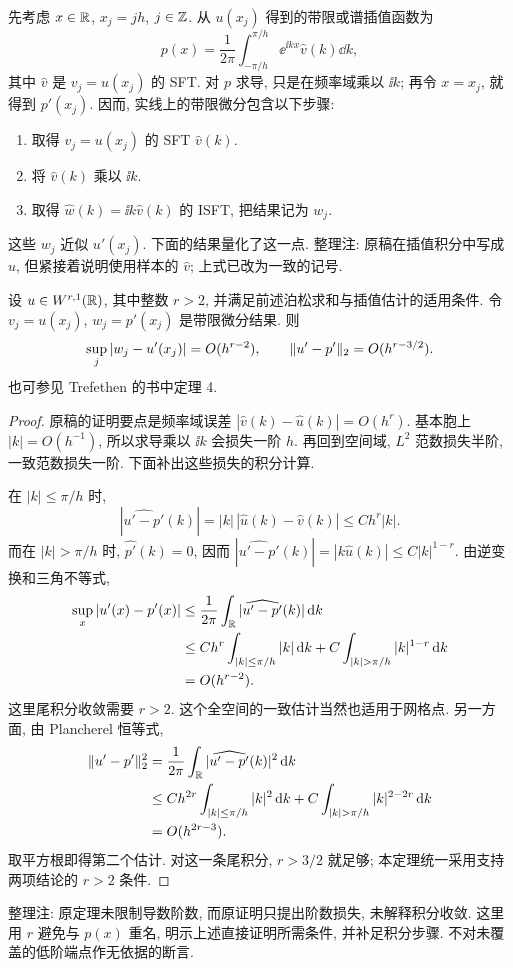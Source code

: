 先考虑 $x\in\mathbb R$, $x_j=jh$, $j\in\mathbb Z$. 从 $u(x_j)$ 得到的带限或谱插值函数为
\[
p(x)=\frac1{2\pi}\int_{-\pi/h}^{\pi/h}\ee^{\ii kx}\widehat v(k)\dd k,
\]
其中 $\widehat v$ 是 $v_j=u(x_j)$ 的 SFT. 对 $p$ 求导, 只是在频率域乘以 $\ii k$; 再令 $x=x_j$, 就得到 $p'(x_j)$. 因而, 实线上的带限微分包含以下步骤:
\begin{enumerate}
\item 取得 $v_j=u(x_j)$ 的 SFT $\widehat v(k)$.
\item 将 $\widehat v(k)$ 乘以 $\ii k$.
\item 取得 $\widehat w(k)=\ii k\widehat v(k)$ 的 ISFT, 把结果记为 $w_j$.
\end{enumerate}
这些 $w_j$ 近似 $u'(x_j)$. 下面的结果量化了这一点. 整理注: 原稿在插值积分中写成 $\widehat u$, 但紧接着说明使用样本的 $\widehat v$; 上式已改为一致的记号.

\begin{theorem}[带限微分的精度]\label{thm:bandlimited-differentiation}
设 $u\in W^{r,1}(\mathbb R)$, 其中整数 $r>2$, 并满足前述泊松求和与插值估计的适用条件. 令 $v_j=u(x_j)$, $w_j=p'(x_j)$ 是带限微分结果. 则
\[
\sup_j|w_j-u'(x_j)|=O(h^{r-2}),
\qquad
\lVert u'-p'\rVert_2=O(h^{r-3/2}).
\]
也可参见 Trefethen 的书中定理 4.
\end{theorem}
\begin{proof}
原稿的证明要点是频率域误差 $|\widehat v(k)-\widehat u(k)|=O(h^r)$. 基本胞上 $|k|=O(h^{-1})$, 所以求导乘以 $\ii k$ 会损失一阶 $h$. 再回到空间域, $L^2$ 范数损失半阶, 一致范数损失一阶. 下面补出这些损失的积分计算.

在 $|k|\le\pi/h$ 时,
\[
|\widehat{u'-p'}(k)|=|k|\,|\widehat u(k)-\widehat v(k)|
\le C h^r|k|.
\]
而在 $|k|>\pi/h$ 时, $\widehat{p'}(k)=0$, 因而
$|\widehat{u'-p'}(k)|=|k\widehat u(k)|\le C|k|^{1-r}$.
由逆变换和三角不等式,
\begin{align*}
\sup_x|u'(x)-p'(x)|
&\le\frac1{2\pi}\int_{\R}|\widehat{u'-p'}(k)|\dd k\\
&\le C h^r\int_{|k|\le\pi/h}|k|\dd k
+C\int_{|k|>\pi/h}|k|^{1-r}\dd k\\
&=O(h^{r-2}).
\end{align*}
这里尾积分收敛需要 $r>2$. 这个全空间的一致估计当然也适用于网格点. 另一方面, 由 Plancherel 恒等式,
\begin{align*}
\norm{u'-p'}_2^2
&=\frac1{2\pi}\int_{\R}|\widehat{u'-p'}(k)|^2\dd k\\
&\le C h^{2r}\int_{|k|\le\pi/h}|k|^2\dd k
+C\int_{|k|>\pi/h}|k|^{2-2r}\dd k\\
&=O(h^{2r-3}).
\end{align*}
取平方根即得第二个估计. 对这一条尾积分, $r>3/2$ 就足够; 本定理统一采用支持两项结论的 $r>2$ 条件.
\end{proof}
\begin{remark}
整理注: 原定理未限制导数阶数, 而原证明只提出阶数损失, 未解释积分收敛. 这里用 $r$ 避免与 $p(x)$ 重名, 明示上述直接证明所需条件, 并补足积分步骤. 不对未覆盖的低阶端点作无依据的断言.
\end{remark}

